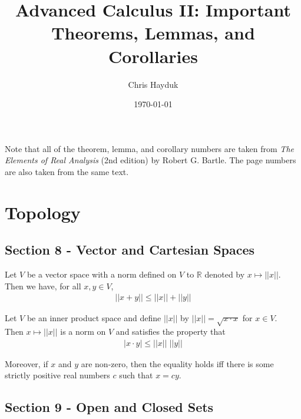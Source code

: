\documentclass[12pt]{article}
\newenvironment{theorem}[2][Theorem]{\begin{trivlist}
\item[\hskip \labelsep {\bfseries #1}\hskip \labelsep {\bfseries #2.}]}{\end{trivlist}}
\begin{document}
\title{Advanced Calculus II: Important Theorems, Lemmas, and Corollaries}

\author{Chris Hayduk}
\date{\today}

\maketitle


Note that all of the theorem, lemma, and corollary numbers are taken from \textit{The Elements of Real Analysis} (2nd edition) by Robert G. Bartle. The page numbers are also taken from the same text.

\section{Topology}

\subsection*{Section 8 - Vector and Cartesian Spaces}

\begin{theorem}[]{Triangle Inequality}
Let $V$ be a vector space with a norm defined on $V$ to $\mathbb{R}$ denoted by $x \mapsto ||x||$. Then we have, for all $x, y \in V$,
\begin{align*}
||x + y|| \leq ||x|| + ||y||
\end{align*}
\end{theorem}

\begin{theorem}[]{Schwarz Inequality}
Let $V$ be an inner product space and define $||x||$ by $||x|| = \sqrt{x \cdot x}$ for $x \in V$.\\

Then $x \mapsto ||x||$ is a norm on $V$ and satisfies the property that
\begin{align*}
|x \cdot y| \leq ||x|| \; ||y||
\end{align*}

Moreover, if $x$ and $y$ are non-zero, then the equality holds iff there is some strictly positive real numbers $c$ such that $x = cy$.
\end{theorem}

\subsection*{Section 9 - Open and Closed Sets} 
\end{document}
